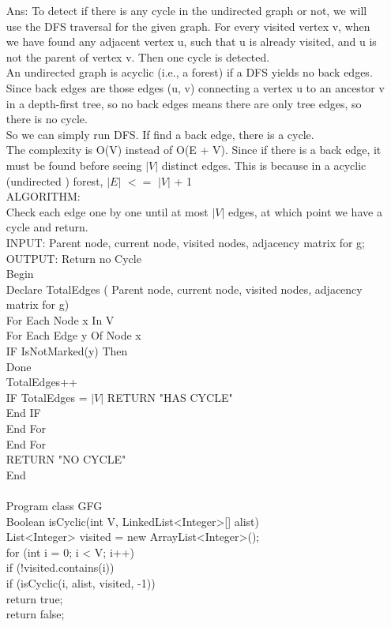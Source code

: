 \documentclass[margin=3mm]{article}
\begin{document}
\begin{enumerate}
\item[Ans: ] To detect if there is any cycle in the undirected graph or not, we will use the DFS traversal for the given graph. For every visited vertex v, when we have found any adjacent vertex u, such that u is already visited, and u is not the parent of vertex v. Then one cycle is detected.\\

An undirected graph is acyclic (i.e., a forest) if a DFS yields no back edges.\\ Since back edges are those edges (u, v) connecting a vertex u to an ancestor v in a depth-first tree, so no back edges means there are only tree edges, so there is no cycle.\\ So we can simply run DFS. If find a back edge, there is a cycle.\\

The complexity is O(V) instead of O(E + V). Since if there is a back edge, it must be found before seeing $|V|$ distinct edges. This is because in a acyclic (undirected ) forest, $|E|$ $<=$ $|V |$ + 1\\

ALGORITHM:\\
   Check each edge one by one until at most $|V|$ edges, at which point we have a cycle and return.\\
INPUT:  Parent node, current node, visited nodes, adjacency matrix for g;\\
OUTPUT: Return no Cycle\\
Begin\\
Declare TotalEdges ( Parent node, current node, visited nodes, adjacency matrix for g)\\
For Each Node x In V\\
    For Each Edge y Of Node x\\
         IF IsNotMarked(y) Then\\
            Done\\
               TotalEdges++\\
               IF TotalEdges = $|V|$ RETURN "HAS CYCLE"\\
         End IF\\
    End For\\
End For\\
RETURN "NO CYCLE"\\
End\\

\\Program
class GFG \\
Boolean isCyclic(int V, LinkedList<Integer>[] alist) \\
    List<Integer> visited = new ArrayList<Integer>();\\
    for (int i = 0; i < V; i++) \\
        if (!visited.contains(i)) \\
            if (isCyclic(i, alist, visited, -1))\\
                return true;\\
    return false;\\


\end{enumerate}
\end{document}
